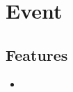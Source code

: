 \section{Event}
\label{module:Event}
\AvailableInJavaAndCsharp{\TODO}
\subsection{Features}
\begin{itemize}
	\item \TODO
\end{itemize}